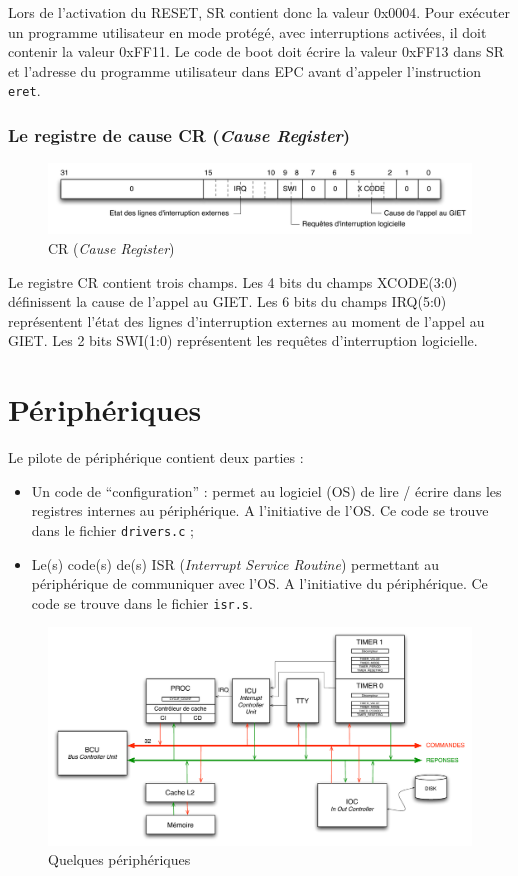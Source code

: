 \documentclass[11pt,english,french]{scrreprt}
\theoremstyle{remark}
\theoremstyle{definition}
\begin{document}
Lors de l’activation du RESET, SR contient donc la valeur 0x0004. Pour exécuter un programme utilisateur en mode protégé, avec interruptions activées, il doit contenir la valeur 0xFF11. Le code de boot doit écrire la valeur 0xFF13 dans SR et l’adresse du programme utilisateur dans EPC avant d’appeler l’instruction \lstinline!eret!.

\subsection{Le registre de cause CR (\emph{Cause Register})} %

\begin{figure}[!h]
	\center
	\includegraphics[scale=.65]{diagrammes/CR}
	\caption{CR (\emph{Cause Register})}
\end{figure}

Le registre CR contient trois champs. Les 4 bits du champs XCODE(3:0) définissent la cause de l'appel au GIET. Les 6 bits du champs IRQ(5:0) représentent l'état des lignes d'interruption externes au moment de l'appel au GIET. Les 2 bits SWI(1:0) représentent les requêtes d'interruption logicielle.


\chapter{Périphériques} %

Le pilote de périphérique contient deux parties :\begin{itemize}
	\item Un code de ``configuration'' : permet au logiciel (OS) de lire / écrire dans les registres internes au périphérique. A l'initiative de l'OS. Ce code se trouve dans le fichier \lstinline!drivers.c! ;
	\item Le(s) code(s) de(s) ISR (\emph{Interrupt Service Routine}) permettant au périphérique de communiquer avec l'OS. A l'initiative du périphérique. Ce code se trouve dans le fichier \lstinline!isr.s!. 
\end{itemize}

\begin{figure}[!h]
	\center
	\includegraphics[scale=.63]{diagrammes/timer}
	\caption{Quelques périphériques}
\end{figure}
\end{document}
